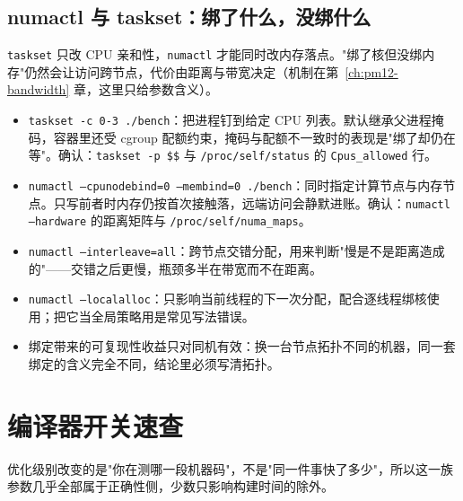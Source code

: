 \documentclass[12pt,a4paper,fontset=fandol]{ctexbook}
\newcommand{\Tp}[1]{\texttt{#1}}
\begin{document}
\subsection{numactl 与 taskset：绑了什么，没绑什么}
\label{sub:pmapB-numa}

\Tp{taskset} 只改 CPU 亲和性，\Tp{numactl} 才能同时改内存落点。"绑了核但没绑内存"仍然会让访问跨节点，代价由距离与带宽决定（机制在第~\ref{ch:pm12-bandwidth} 章，这里只给参数含义）。

\begin{itemize}
\item \Tp{taskset -c 0-3 ./bench}：把进程钉到给定 CPU 列表。默认继承父进程掩码，容器里还受 cgroup 配额约束，掩码与配额不一致时的表现是"绑了却仍在等"。确认：\Tp{taskset -p \$\$} 与 \Tp{/proc/self/status} 的 \Tp{Cpus\_allowed} 行。
\item \Tp{numactl --cpunodebind=0 --membind=0 ./bench}：同时指定计算节点与内存节点。只写前者时内存仍按首次接触落，远端访问会静默进账。确认：\Tp{numactl --hardware} 的距离矩阵与 \Tp{/proc/self/numa\_maps}。
\item \Tp{numactl --interleave=all}：跨节点交错分配，用来判断"慢是不是距离造成的"——交错之后更慢，瓶颈多半在带宽而不在距离。
\item \Tp{numactl --localalloc}：只影响当前线程的下一次分配，配合逐线程绑核使用；把它当全局策略用是常见写法错误。
\item 绑定带来的可复现性收益只对同机有效：换一台节点拓扑不同的机器，同一套绑定的含义完全不同，结论里必须写清拓扑。
\end{itemize}

\section{编译器开关速查}
\label{sec:pmapB-ccflag}

优化级别改变的是"你在测哪一段机器码"，不是"同一件事快了多少"，所以这一族参数几乎全部属于正确性侧，少数只影响构建时间的除外。
\end{document}
